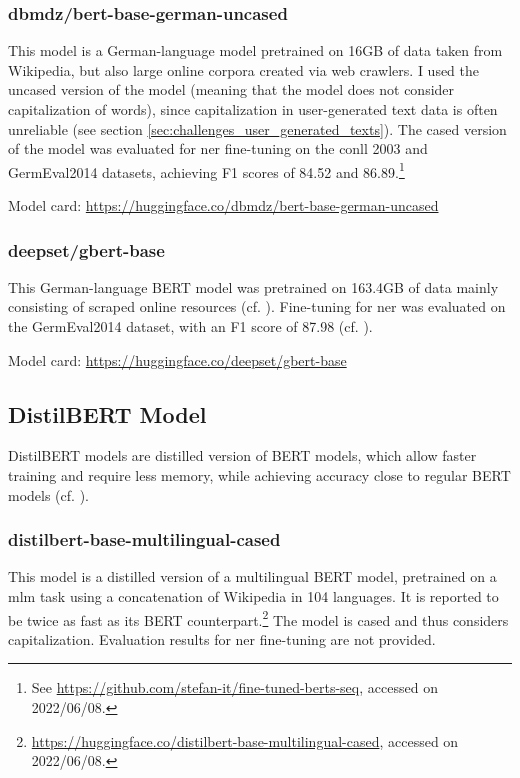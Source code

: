 \subsubsection{dbmdz/bert-base-german-uncased}
This model is a German-language model pretrained on 16GB of data taken from Wikipedia, but also large online corpora created via web crawlers. I used the uncased version of the model (meaning that the model does not consider capitalization of words), since capitalization in user-generated text data is often unreliable (see section \ref{sec:challenges_user_generated_texts}). 
The cased version of the model was evaluated for \gls{ner} fine-tuning on the \gls{conll} 2003 and GermEval2014 datasets, achieving F1 scores of 84.52 and 86.89.\footnote{See \url{https://github.com/stefan-it/fine-tuned-berts-seq}, accessed on 2022/06/08.} 

Model card: \url{https://huggingface.co/dbmdz/bert-base-german-uncased}

\subsubsection{deepset/gbert-base}
This German-language BERT model was pretrained on 163.4GB of data mainly consisting of scraped online resources (cf. \cite{bert_german_2020}). Fine-tuning for \gls{ner} was evaluated on the GermEval2014 dataset, with an F1 score of 87.98 (cf. \cite{bert_german_2020}).

Model card: \url{https://huggingface.co/deepset/gbert-base}


\subsection{DistilBERT Model}
DistilBERT models are distilled version of BERT models, which allow faster training and require less memory, while achieving accuracy close to regular BERT models (cf. \cite[80]{tunstall_natural_2022}).

\subsubsection{distilbert-base-multilingual-cased}
This model is a distilled version of a multilingual BERT model, pretrained on a \gls{mlm} task using a concatenation of Wikipedia in 104 languages. It is reported to be twice as fast as its BERT counterpart.\footnote{\url{https://huggingface.co/distilbert-base-multilingual-cased}, accessed on 2022/06/08.} The model is cased and thus considers capitalization. Evaluation results for \gls{ner} fine-tuning are not provided. 

